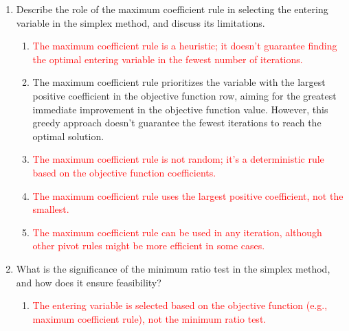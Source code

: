 \documentclass{article}%
\newcommand{\incorrect}[1]{\textcolor{red}{#1}}
\begin{document}
\begin{enumerate}
\begin{enumerate}
\item \incorrect{Finding the optimal solution is the overall goal of the simplex method, but a pivot is a single step in that process.  Geometrically, it's not simply finding the highest point, but rather moving along the edges of the feasible region.}%
\item \incorrect{Pivoting is a systematic process, not a random selection.  The choice of entering and leaving variables is based on specific rules to ensure improvement in the objective function and maintain feasibility.}%
\item \incorrect{The initial step involves setting non-basic variables to zero, which corresponds to selecting a specific vertex (often the origin if feasible), but the pivot operation comes later in the algorithm.}%
\end{enumerate}%
\vspace{1em}%
\item Describe the role of the maximum coefficient rule in selecting the entering variable in the simplex method, and discuss its limitations.%
\begin{enumerate}%
\item \incorrect{The maximum coefficient rule is a heuristic; it doesn't guarantee finding the optimal entering variable in the fewest number of iterations.}%
\item The maximum coefficient rule prioritizes the variable with the largest positive coefficient in the objective function row, aiming for the greatest immediate improvement in the objective function value. However, this greedy approach doesn't guarantee the fewest iterations to reach the optimal solution.%
\item \incorrect{The maximum coefficient rule is not random; it's a deterministic rule based on the objective function coefficients.}%
\item \incorrect{The maximum coefficient rule uses the largest positive coefficient, not the smallest.}%
\item \incorrect{The maximum coefficient rule can be used in any iteration, although other pivot rules might be more efficient in some cases.}%
\end{enumerate}%
\vspace{1em}%
\item What is the significance of the minimum ratio test in the simplex method, and how does it ensure feasibility?%
\begin{enumerate}%
\item \incorrect{The entering variable is selected based on the objective function (e.g., maximum coefficient rule), not the minimum ratio test.}%

\end{enumerate}
\end{enumerate}
\end{document}
